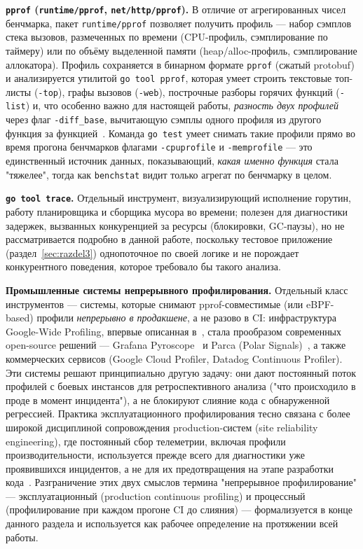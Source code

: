 \documentclass[12pt,a4paper]{article}
\numberwithin{equation}{section}
\begin{document}
\textbf{\texttt{pprof} (\texttt{runtime/\allowbreak pprof}, \texttt{net/\allowbreak http/\allowbreak pprof}).}
В отличие от агрегированных чисел бенчмарка, пакет \texttt{runtime/\allowbreak pprof}
позволяет получить профиль — набор сэмплов стека вызовов, размеченных по
времени (CPU-профиль, сэмплирование по таймеру) или по объёму выделенной
памяти (heap/alloc-профиль, сэмплирование аллокатора). Профиль сохраняется в
бинарном формате \texttt{pprof} (сжатый protobuf) и анализируется утилитой
\texttt{go tool pprof}, которая умеет строить текстовые топ-листы
(\texttt{-top}), графы вызовов (\texttt{-web}), построчные разборы горячих
функций (\texttt{-list}) и, что особенно важно для настоящей работы, \emph{разность
двух профилей} через флаг \texttt{-diff\_base}, вычитающую сэмплы одного
профиля из другого функция за функцией~\cite{go-pprof-doc,go-pprof-tool,pprof-github}.
Команда \texttt{go test} умеет снимать такие профили прямо во время прогона
бенчмарков флагами \texttt{-cpuprofile} и \texttt{-memprofile} — это
единственный источник данных, показывающий, \emph{какая именно функция}
стала "тяжелее", тогда как \texttt{benchstat} видит только агрегат по
бенчмарку в целом.

\textbf{\texttt{go tool trace}.} Отдельный инструмент, визуализирующий
исполнение горутин, работу планировщика и сборщика мусора во времени;
полезен для диагностики задержек, вызванных конкуренцией за ресурсы
(блокировки, GC-паузы), но не рассматривается подробно в данной работе,
поскольку тестовое приложение (раздел~\ref{sec:razdel3}) однопоточное по
своей логике и не порождает конкурентного поведения, которое требовало бы
такого анализа.

\textbf{Промышленные системы непрерывного профилирования.} Отдельный класс
инструментов — системы, которые снимают pprof-совместимые (или
eBPF-based) профили \emph{непрерывно в продакшене}, а не разово в CI:
инфраструктура Google-Wide Profiling, впервые описанная
в~\cite{ren2010}, стала прообразом современных open-source решений —
Grafana Pyroscope~\cite{pyroscope-doc} и Parca (Polar Signals)~\cite{parca-doc},
а также коммерческих сервисов (Google Cloud Profiler, Datadog Continuous
Profiler). Эти системы решают принципиально другую задачу: они дают
постоянный поток профилей с боевых инстансов для ретроспективного анализа
("что происходило в проде в момент инцидента"), а не блокируют слияние кода
с обнаруженной регрессией. Практика эксплуатационного профилирования тесно
связана с более широкой дисциплиной сопровождения production-систем
(site reliability engineering), где постоянный сбор телеметрии, включая
профили производительности, используется прежде всего для диагностики уже
проявившихся инцидентов, а не для их предотвращения на этапе разработки
кода~\cite{beyer-sre}. Разграничение этих двух смыслов термина
"непрерывное профилирование" — эксплуатационный (production continuous
profiling) и процессный (профилирование при каждом прогоне CI до слияния) —
формализуется в конце данного раздела и используется как рабочее определение
на протяжении всей работы.
\end{document}
